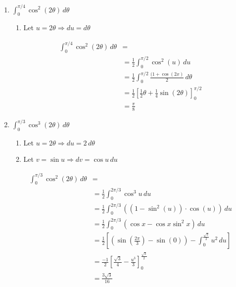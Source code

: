 \documentclass[letter,11pt]{article}
\begin{document}
\begin{enumerate}[label=\roman*.]
    \item $\int_{0}^{\pi/4} \cos^2(2\theta)\, d\theta$
    \begin{enumerate}
        \item Let $u =2\theta \Longrightarrow du = d\theta$
    \end{enumerate}
        \begin{align*}
            \int_{0}^{\pi/4} \cos^2(2\theta)\, d\theta &=\\ 
            &= \frac{1}{2} \int_{0}^{\pi/2} \cos^2(u) \, du\\
            &= \frac{1}{2} \int_{0}^{\pi/2} \frac{(1+\cos(2x)}{2} \, d\theta\\
            &= \frac{1}{2} \left[\frac{1}{2}\theta + \frac{1}{4}\sin(2\theta)\right]_{0}^{\pi/2}\\
            &= \boxed{\frac{\pi}{8}}
        \end{align*}
    \item $\int_{0}^{\pi/3} \cos^3(2\theta)\, d\theta$
    \begin{enumerate}
        \item Let $u=2\theta \Longrightarrow du = 2 \, d\theta$
        \item Let $v = \sin u \Longrightarrow dv = \cos u \, du$
    \end{enumerate}
    \begin{align*}
        \int_{0}^{\pi/3} \cos^2(2\theta)\, d\theta & = \\
        &= \frac{1}{2} \int_{0}^{2\pi/3} \cos^3 u \, du\\
         &= \frac{1}{2} \int_{0}^{2\pi/3} \left((1-\sin^2(u))\cdot \cos(u)\right) \, du\\
         &= \frac{1}{2} \int_{0}^{2\pi/3} \left(\cos x - \cos x\sin^2 x \right) \, du\\
         &= \frac{1}{2} \left[\left(\sin \left(\frac{2\pi}{3}\right)- \sin \left(0\right) \right) - \int_{0}^{\frac{\sqrt{3}}{2}} u^2 \, du\right]\\
         &= \frac{-1}{2} \left[\frac{\sqrt{3}}{4}-\frac{u^3}{3}\right]_{0}^{\frac{\sqrt{3}}{2}}\\
         &= \boxed{\frac{3\sqrt{3}}{16}}
    \end{align*}
\end{enumerate}
\end{document}
